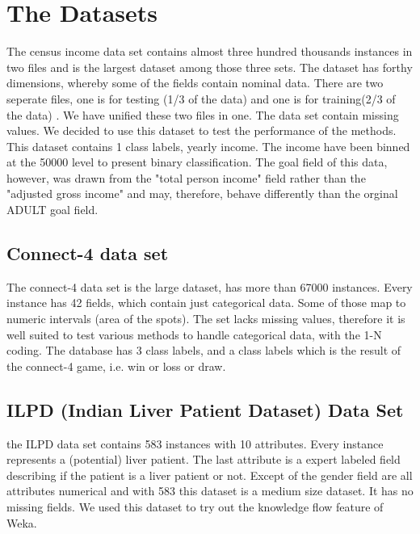 \documentclass[a4paper]{article}
\begin{document}
\section{The Datasets}
The census income data set contains almost three hundred thousands instances in
two files and is the largest dataset among those three sets. The dataset has
forthy dimensions, whereby some of the fields contain nominal data. There are
two seperate files, one is for testing (1/3 of the data) and one is for
training(2/3 of the data) . We have unified these two files in one. The data set
contain missing values. We decided to use this dataset to test the performance
of the methods. This dataset contains 1 class labels, yearly income. The income
have been binned at the 50000 level to present binary classification. The goal
field of this data, however, was drawn from the "total person income" field
rather than the "adjusted gross income" and may, therefore, behave differently
than the orginal ADULT goal field.

\subsection{Connect-4 data set}
The connect-4 data set is the large dataset, has more than 67000 instances.
Every instance has 42 fields, which contain just categorical data. Some of those
map to numeric intervals
(area of the spots). The set lacks missing values, therefore it is well suited
to test various methods to handle categorical data, with the 1-N coding. The
database has 3 class labels, and a class labels which
is the result of the connect-4 game, i.e. win or loss or draw.

\subsection{ILPD (Indian Liver Patient Dataset) Data Set}
the ILPD data set contains 583 instances with 10 attributes. Every instance
represents a (potential) liver patient. The last attribute is a expert labeled
field describing if the patient is 
a liver patient or not. Except of the gender field are all attributes numerical
and with 583 this dataset is a medium size dataset. It has no missing fields. 
We used this dataset to try out the knowledge flow feature of Weka.
\end{document}
